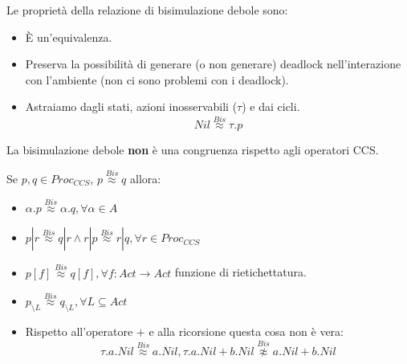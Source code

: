 \begin{osservazione}
    Le proprietà della relazione di bisimulazione debole sono:
    \begin{itemize}
        \item È un'equivalenza.
        \item Preserva la possibilità di generare (o non generare) deadlock
              nell'interazione con l'ambiente (non ci sono problemi con i deadlock).
        \item Astraiamo dagli stati, azioni inosservabili ($\tau$) e dai cicli.
              \begin{equation}
                  Nil \stackrel{Bis}{\approx} \tau . p
              \end{equation}
    \end{itemize}
\end{osservazione}
La bisimulazione debole \textbf{non} è una congruenza rispetto agli operatori CCS.
\begin{teorema}
    Se $p, q \in Proc_{CCS}$, $p \stackrel{Bis}{\approx} q$ allora:
    \begin{itemize}
        \item $\alpha . p \stackrel{Bis}{\approx} \alpha . q, \forall \alpha \in A$
        \item $p | r \stackrel{Bis}{\approx} q | r \land r | p \stackrel{Bis}{\approx}
                  r | q, \forall r \in Proc_{CCS}$
        \item $p[f] \stackrel{Bis}{\approx} q[f], \forall f: Act \to Act$ funzione
              di rietichettatura.
        \item $p_{\setminus L} \stackrel{Bis}{\approx} q_{\setminus L}, \forall
                  L \subseteq Act$
        \item Rispetto all'operatore $+$ e alla ricorsione questa cosa non è vera:
              \begin{equation}
                  \tau . a . Nil \stackrel{Bis}{\approx} a.Nil, \tau . a . Nil + b.Nil
                  \stackrel{Bis}{\not\approx} a.Nil + b.Nil
              \end{equation}
    \end{itemize}
\end{teorema}

